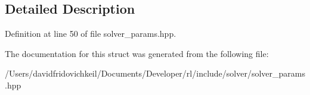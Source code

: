 \subsection{Detailed Description}


Definition at line 50 of file solver\+\_\+params.\+hpp.



The documentation for this struct was generated from the following file\+:\begin{DoxyCompactItemize}
\item 
/\+Users/davidfridovichkeil/\+Documents/\+Developer/rl/include/solver/solver\+\_\+params.\+hpp\end{DoxyCompactItemize}
